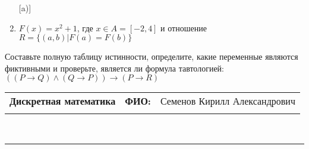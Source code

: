 \documentclass[10pt]{exam}
\newcommand{\class}{Дискретная математика}
\newcommand{\examdate}{}
\begin{document}
\begin{questions}
\begin{enumerate} [a)]
\item $F(x)=x^{2}+1$, где $x \in A = [-2, 4]$ и отношение $R = \{(a,b)|F(a) = F(b)\}$
\end{enumerate}\question Составьте полную таблицу истинности, определите, какие переменные являются фиктивными и проверьте, является ли формула тавтологией:
$(( P \rightarrow Q) \land (Q \rightarrow P)) \rightarrow (P \rightarrow R)$

\end{questions}
\newpage
\begin{flushright}
\begin{tabular}{p{2.8in} r l}
\textbf{\class} & \textbf{ФИО:} &Семенов Кирилл Александрович
\\

\textbf{\examdate} &&\\
\end{tabular}\\
\end{flushright}
\rule[1ex]{\textwidth}{.1pt}
\end{document}
